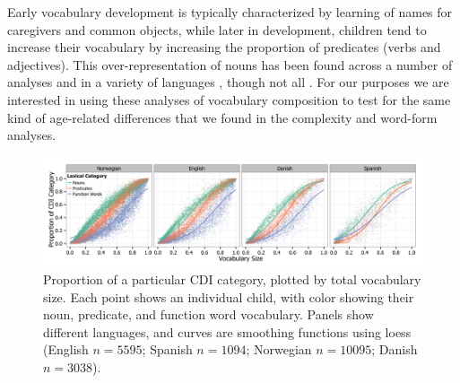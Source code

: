 \documentclass[10pt,letterpaper]{article}
\begin{document}
Early vocabulary development is typically characterized by learning of names for caregivers and common objects, while later in development, children tend to increase their vocabulary by increasing the proportion of predicates (verbs and adjectives). This over-representation of nouns has been found across a number of analyses and in a variety of languages \cite{bates1994,caselli1995,bornstein2004}, though not all \cite{tardif1996,choi1995}.
For our purposes we are interested in using these analyses of vocabulary composition to test for the same kind of age-related differences that we found in the complexity and word-form analyses. 

\begin{figure}
\begin{center}
\includegraphics[width=\textwidth]{plots/composition_fit.png}
\end{center}
\caption{\label{fig:vocab_comp} Proportion of a particular CDI category, plotted by total vocabulary size. Each point shows an individual child, with color showing their noun, predicate, and function word vocabulary. Panels show different languages, and curves are smoothing functions using loess (English $n=5595$; Spanish $n=1094$; Norwegian $n=10095$; Danish $n=3038$).} 
\end{figure}
\end{document}
